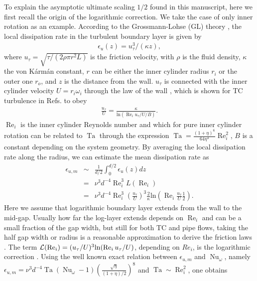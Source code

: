 \documentclass[aps,prl,superscriptaddress,preprint]{revtex4}
\renewcommand{\Re}{\operatorname{Re}}
\newcommand{\Ta}{\operatorname{Ta}}
\newcommand{\Nu}{\operatorname{Nu}_{\omega}}
\begin{document}
To explain the asymptotic ultimate scaling $1/2$ found in this manuscript, here we first recall the origin of the logarithmic correction. We take the case of only inner rotation as an example. According to the Grossmann-Lohse (GL) theory \cite{gro11}, the local dissipation rate in the turbulent boundary layer \cite{ll87} is given by 
\begin{eqnarray}\label{EQ10}
\epsilon_u(z)=u_\tau^3/(\kappa z), 
\end{eqnarray}
where $u_\tau=\sqrt  {\tau / (2\rho \pi r^2 L) }$ is the friction velocity, with $\rho$ is the fluid density, $\kappa$ the von K\'arm\'an constant, $r$ can be either the inner cylinder radius $r_i$ or the outer one $r_o$, and $z$ is the distance from the wall. $u_\tau$ is connected with the inner cylinder velocity $U=r_i\omega_i$ through the law of the wall \cite{sch00}, which is shown for TC turbulence in Refs. \cite{hui13,ost14pof} to obey 
\begin{eqnarray}\label{EQ3}
\frac{u_\tau}{U}=\frac{\kappa}{\mathrm{ln}(\Re_i   {u_\tau}/{U}  /{B})}.
\end{eqnarray}
$\Re_i$ is the inner cylinder Reynolds number and which for pure inner cylinder rotation can be related to $\Ta$ through the expression $\Ta=\frac{(1+\eta)^6}{64\eta^4}\Re_i^2$, $B$ is a constant depending on the system geometry. By averaging the local dissipation rate along the radius, we can estimate the mean dissipation rate as
\begin{eqnarray}\label{EQ4}
\epsilon_{u,m} &\sim& \frac{1}{d/2} \int_{0}^{d/2} \epsilon_u(z)dz    \nonumber\\
                       &=& \nu^3d^{-4}\Re_i^3 L(\Re_i)                                                                             \nonumber\\
                       &=& \nu^3d^{-4}\Re_i^3 \left( \frac{u_\tau}{U} \right)^3 \frac{2}{\kappa}\mathrm{ln}\left(\Re_i\frac{u_\tau}{U}\frac{1}{2}\right).
\end{eqnarray}
Here we assume that logarithmic boundary layer extends from the wall to the mid-gap. Usually how far the log-layer extends depends on $\Re_i$ and can be a small fraction of the gap width, but still for both TC and pipe flows, taking the half gap width or radius  is a reasonable approximation to derive the friction laws \cite{lat92,lew99,sch00,pop00}. The term ${\cal{L}}(\Re_i)= (u_\tau/U)^3 \mathrm{ln}(\Re_iu_\tau/U)$, depending on $Re_i$, is the logarithmic correction \cite{gro11}. Using the well known exact relation between $\epsilon_{u,m}$ and $\Nu$, namely $\epsilon_{u,m}=\nu^3 d^{-4}\Ta(\Nu-1)\left (\frac{\sqrt \eta}{(1+\eta)/2} \right)^8$ \cite{eck07b} and $\Ta\sim  \Re_i^2$, one obtains
\end{document}
